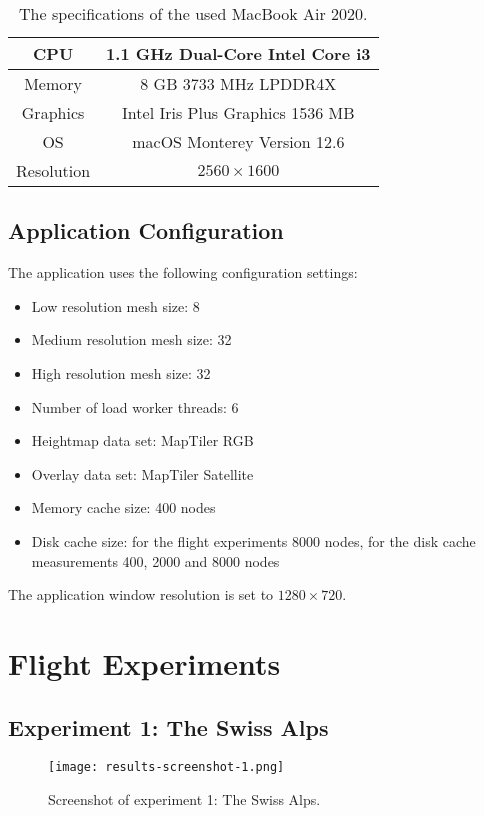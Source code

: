 \begin{table}[H]
  \begin{center}
    \begin{tabular}{ c|c }
      CPU & 1.1 GHz Dual-Core Intel Core i3\\
      \hline
      Memory & 8 GB 3733 MHz LPDDR4X\\
      \hline
      Graphics & Intel Iris Plus Graphics 1536 MB\\
      \hline
      OS & macOS Monterey Version 12.6\\
      \hline
      Resolution & $2560 \times 1600$
    \end{tabular}
  \end{center}
  \caption{The specifications of the used MacBook Air 2020.}\label{tbl:specs}
  \end{table}

\subsection{Application Configuration}
The application uses the following configuration settings:
\begin{itemize}
  \item Low resolution mesh size: 8
  \item Medium resolution mesh size: 32
  \item High resolution mesh size: 32
  \item Number of load worker threads: 6
  \item Heightmap data set: MapTiler RGB
  \item Overlay data set: MapTiler Satellite
  \item Memory cache size: 400 nodes
  \item Disk cache size: for the flight experiments 8000 nodes, for the disk cache measurements 400, 2000 and 8000 nodes
\end{itemize}
The application window resolution is set to $1280 \times 720$.
\pagebreak

\section{Flight Experiments}
\subsection{Experiment 1: The Swiss Alps}
\begin{figure}[H]
  \centering
  \texttt{[image: results-screenshot-1.png]}
  \caption{Screenshot of experiment 1: The Swiss Alps.}\label{fig:results-screenshot-1}
\end{figure}


